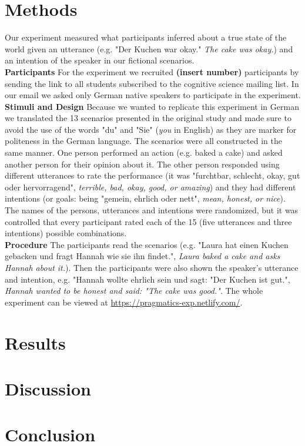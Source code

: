 \documentclass[a4paper,11pt]{article}
\begin{document}
\section{Methods}
Our experiment measured what participants inferred about a true state of the world given an utterance (e.g. "Der Kuchen war okay." \textit{The cake was okay.}) and an intention of the speaker in our fictional scenarios. \\
\textbf{Participants} For the experiment we recruited \textbf{(insert number)} participants by sending the link to all students subscribed to the cognitive science mailing list. In our email we asked only German native speakers to participate in the experiment.\\
\textbf{Stimuli and Design} Because we wanted to replicate this experiment in German we translated the 13 scenarios presented in the original study and made sure to avoid the use of the words "du" and "Sie" (\textit{you} in English) as they are marker for politeness in the German language. The scenarios were all constructed in the same manner. One person performed an action (e.g. baked a cake) and asked another person for their opinion about it. The other person responded using different utterances to rate the performance (it was "furchtbar, schlecht, okay, gut oder hervorragend", \textit{terrible, bad, okay, good, or amazing}) and they had different intentions (or goals: being "gemein, ehrlich oder nett", \textit{mean, honest, or nice}). The names of the persons, utterances and intentions were randomized, but it was controlled that every participant rated each of the 15 (five utterances and three intentions) possible combinations.\\
\textbf{Procedure} The participants read the scenarios (e.g. "Laura hat einen Kuchen gebacken und fragt Hannah wie sie ihn findet.", \textit{Laura baked a cake and asks Hannah about it.}). Then the participants were also shown the speaker's utterance and intention, e.g. "Hannah wollte ehrlich sein und sagt: "Der Kuchen ist gut.", \textit{Hannah wanted to be honest and said: "The cake was good."}. The whole experiment can be viewed at \url{https://pragmatics-exp.netlify.com/}. 

\section{Results}

\section{Discussion}

\section{Conclusion}



\end{document}

